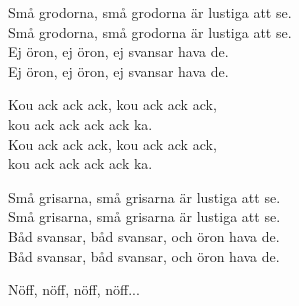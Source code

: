 \vspace{10pt}
Små grodorna, små grodorna är lustiga att se.\\
Små grodorna, små grodorna är lustiga att se.\\
Ej öron, ej öron, ej svansar hava de.\\
Ej öron, ej öron, ej svansar hava de.\par
\vspace{10pt}
Kou ack ack ack, kou ack ack ack,\\
kou ack ack ack ack ka.\\
Kou ack ack ack, kou ack ack ack,\\
kou ack ack ack ack ka.\par
\vspace{10pt}
Små grisarna, små grisarna är lustiga att se.\\
Små grisarna, små grisarna är lustiga att se.\\
Båd svansar, båd svansar, och öron hava de.\\
Båd svansar, båd svansar, och öron hava de.\par
\vspace{10pt}
Nöff, nöff, nöff, nöff...
